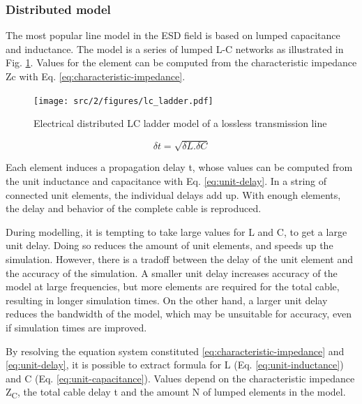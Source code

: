 \subsubsection{Distributed model}

The most popular line model in the ESD field is based on lumped capacitance and inductance.
The model is a series of lumped L-C networks as illustrated in Fig. \ref{fig:dis-line-model}.
Values for the element can be computed from the characteristic impedance \gls{Zc} with Eq. \ref{eq:characteristic-impedance}.

\begin{figure}[!h]
  \centering
  \texttt{[image: src/2/figures/lc\_ladder.pdf]}
  \caption{Electrical distributed LC ladder model of a lossless transmission line}
  \label{fig:dis-line-model}
\end{figure}

\begin{equation}
\delta t = \sqrt{\delta L.\delta C}
\label{eq:unit-delay}
\end{equation}

Each element induces a propagation delay \textdelta{}t, whose values can be computed from the unit inductance and capacitance with Eq. \ref{eq:unit-delay}.
In a string of connected unit elements, the individual delays add up.
With enough elements, the delay and behavior of the complete cable is reproduced.

During modelling, it is tempting to take large values for \textdelta{}L and \textdelta{}C, to get a large unit delay.
Doing so reduces the amount of unit elements, and speeds up the simulation.
However, there is a tradoff between the delay of the unit element and the accuracy of the simulation.
A smaller unit delay increases accuracy of the model at large frequencies, but more elements are required for the total cable, resulting in longer simulation times.
On the other hand, a larger unit delay reduces the bandwidth of the model, which may be unsuitable for accuracy, even if simulation times are improved.

By resolving the equation system constituted \ref{eq:characteristic-impedance} and \ref{eq:unit-delay}, it is possible to extract formula for L (Eq. \ref{eq:unit-inductance}) and C (Eq. \ref{eq:unit-capacitance}).
Values depend on the characteristic impedance Z\textsubscript{C}, the total cable delay \textDelta{}t and the amount N of lumped elements in the model.

